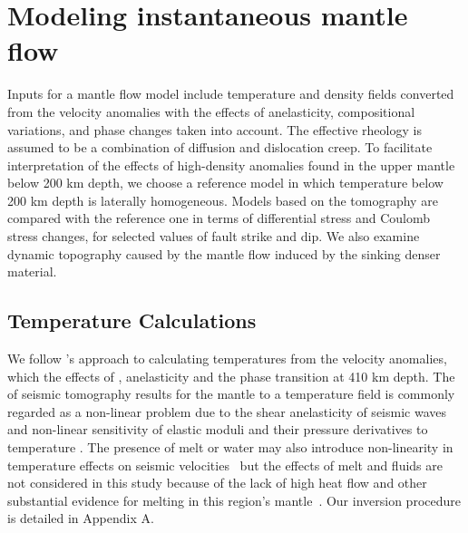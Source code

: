 \documentclass[draft,linenumbers]{agujournal2018}
\begin{document}
\section{Modeling instantaneous mantle flow}
    Inputs for a mantle flow model include temperature and density fields converted from the velocity anomalies with the effects of anelasticity, compositional variations, and phase changes taken into account. The effective rheology is assumed to be a combination of diffusion and dislocation creep. To facilitate interpretation of the effects of high-density anomalies found in the upper mantle below 200 km depth, we choose a reference model in which temperature below 200 km depth is laterally homogeneous. Models based on the tomography are compared with the reference one in terms of differential stress and Coulomb stress changes, for selected values of fault strike and dip. We also examine dynamic topography caused by the mantle flow induced by the sinking denser material.
    
\subsection{Temperature Calculations} \label{temp_var}
    We follow \citet{Cammarano2003}'s approach to calculating temperatures from the velocity anomalies, which  the effects of , anelasticity and the phase transition at 410 km depth. The  of seismic tomography results for the mantle to a temperature field is commonly regarded as a non-linear problem due to the shear anelasticity of seismic waves \citep{minster1981model, karato1993importance, sobolev1996upper, Goes_2000, artemieva2004shear} and non-linear sensitivity of elastic moduli and their pressure derivatives to temperature \citep{duffy1989seismic, anderson1992high, Cammarano2003, stixrude2005thermodynamics}. The presence of melt or water may also introduce non-linearity in temperature effects on seismic velocities~\citep{Karato_1998} but the effects of melt and fluids are not considered in this study because of the lack of high heat flow and other substantial evidence for melting in this region's mantle~\citep{blackwell2006assessment}. Our inversion procedure is detailed in Appendix A.
%
    
\end{document}
